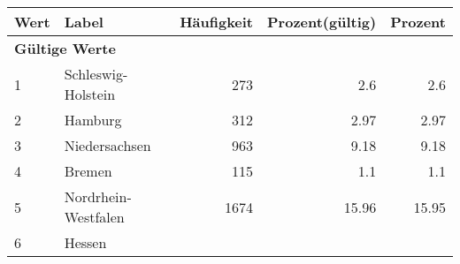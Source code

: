      \begin{longtable}{lXrrr}
     \toprule
     \textbf{Wert} & \textbf{Label} & \textbf{Häufigkeit} & \textbf{Prozent(gültig)} & \textbf{Prozent} \\
     \endhead
     \midrule
     \multicolumn{5}{l}{\textbf{Gültige Werte}}\\

     1 &
     \multicolumn{1}{X}{ Schleswig-Holstein   } &


       \num{273} &
       \num[round-mode=places,round-precision=2]{2.6} &
         \num[round-mode=places,round-precision=2]{2.6} \\

     2 &
     \multicolumn{1}{X}{ Hamburg   } &


       \num{312} &
       \num[round-mode=places,round-precision=2]{2.97} &
         \num[round-mode=places,round-precision=2]{2.97} \\

     3 &
     \multicolumn{1}{X}{ Niedersachsen   } &


       \num{963} &
       \num[round-mode=places,round-precision=2]{9.18} &
         \num[round-mode=places,round-precision=2]{9.18} \\

     4 &
     \multicolumn{1}{X}{ Bremen   } &


       \num{115} &
       \num[round-mode=places,round-precision=2]{1.1} &
         \num[round-mode=places,round-precision=2]{1.1} \\

     5 &
     \multicolumn{1}{X}{ Nordrhein-Westfalen   } &


       \num{1674} &
       \num[round-mode=places,round-precision=2]{15.96} &
         \num[round-mode=places,round-precision=2]{15.95} \\

     6 &
     \multicolumn{1}{X}{ Hessen   } &



\end{longtable}
